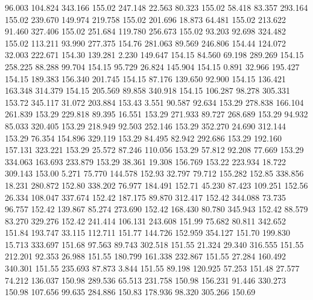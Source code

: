   96.003  104.824  343.166       155.02
 247.148   22.563   80.323       155.02
  58.418   83.357  293.164       155.02
 239.670  149.974  219.758       155.02
 201.696   18.873   64.481       155.02
 213.622   91.460  327.406       155.02
 251.684  119.780  256.673       155.02
  93.203   92.698  324.482       155.02
 113.211   93.990  277.375       154.76
 281.063   89.569  246.806       154.44
 124.072   32.003  222.671       154.30
 139.281    2.230  149.647       154.15
  84.560   69.198  289.269       154.15
 258.225   88.288   99.704       154.15
  95.729   26.824  145.904       154.15
   0.891   32.966  195.427       154.15
 189.383  156.340  201.745       154.15
  87.176  139.650   92.900       154.15
 136.421  163.348  314.379       154.15
 205.569   89.858  340.918       154.15
 106.287   98.278  305.331       153.72
 345.117   31.072  203.884       153.43
   3.551   90.587   92.634       153.29
 278.838  166.104  261.839       153.29
 229.818   89.395   16.551       153.29
 271.933   89.727  268.689       153.29
  94.932   85.033  320.405       153.29
 218.949   92.503  252.146       153.29
 352.270   24.690  312.144       153.29
  76.354  154.896  329.119       153.29
  84.495   82.942  292.686       153.29
 192.160  157.131  323.221       153.29
  25.572   87.246  110.056       153.29
  57.812   92.208   77.669       153.29
 334.063  163.693  233.879       153.29
  38.361   19.308  156.769       153.22
 223.934   18.722  309.143       153.00
   5.271   75.770  144.578       152.93
  32.797   79.712  155.282       152.85
 338.856   18.231  280.872       152.80
 338.202   76.977  184.491       152.71
  45.230   87.423  109.251       152.56
  26.334  108.047  337.674       152.42
 187.175   89.870  312.417       152.42
 344.088   73.735   96.757       152.42
 139.867   85.274  273.690       152.42
 168.430   80.780  345.943       152.42
  88.579   83.270  329.276       152.42
 241.414  106.131  243.608       151.99
  75.682   80.811  342.652       151.84
 193.747   33.115  112.711       151.77
 144.726  152.959  354.127       151.70
 199.830   15.713  333.697       151.68
  97.563   89.743  302.518       151.55
  21.324   29.340  316.555       151.55
 212.201   92.353   26.988       151.55
 180.799  161.338  232.867       151.55
  27.284  160.492  340.301       151.55
 235.693   87.873    3.844       151.55
  89.198  120.925   57.253       151.48
  27.577   74.212  136.037       150.98
 289.536   65.513  231.758       150.98
 156.231   91.446  330.273       150.98
 107.656   99.635  284.886       150.83
 178.936   98.320  305.266       150.69
